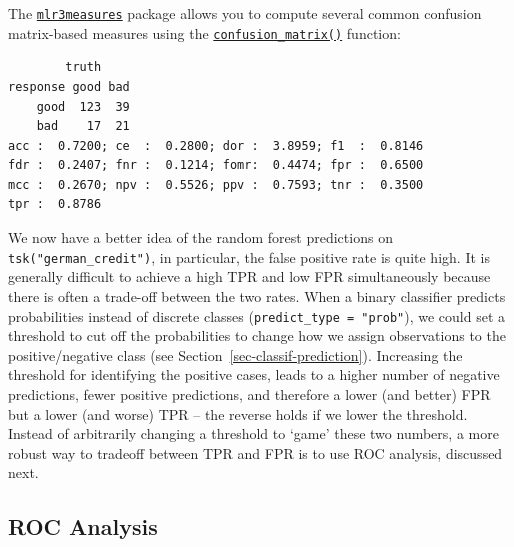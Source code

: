 The
\href{https://cran.r-project.org/package=mlr3measures}{\texttt{mlr3measures}}
package allows you to compute several common confusion matrix-based
measures using the
\href{https://www.rdocumentation.org/packages/mlr3measures/topics/confusion_matrix}{\texttt{confusion\_matrix()}}
function:

\begin{Shaded}
\begin{Highlighting}[]
\SpecialCharTok{::}\NormalTok{(}\SpecialCharTok{$}
  \SpecialCharTok{$}\SpecialCharTok{$}
\end{Highlighting}
\end{Shaded}

\begin{verbatim}
        truth
response good bad
    good  123  39
    bad    17  21
acc :  0.7200; ce  :  0.2800; dor :  3.8959; f1  :  0.8146 
fdr :  0.2407; fnr :  0.1214; fomr:  0.4474; fpr :  0.6500 
mcc :  0.2670; npv :  0.5526; ppv :  0.7593; tnr :  0.3500 
tpr :  0.8786 
\end{verbatim}

We now have a better idea of the random forest predictions on
\texttt{tsk("german\_credit")}, in particular, the false positive rate
is quite high. It is generally difficult to achieve a high TPR and low
FPR simultaneously because there is often a trade-off between the two
rates. When a binary classifier predicts probabilities instead of
discrete classes (\texttt{predict\_type\ =\ "prob"}), we could set a
threshold to cut off the probabilities to change how we assign
observations to the positive/negative class (see
Section~\ref{sec-classif-prediction}). Increasing the threshold for
identifying the positive cases, leads to a higher number of negative
predictions, fewer positive predictions, and therefore a lower (and
better) FPR but a lower (and worse) TPR -- the reverse holds if we lower
the threshold. Instead of arbitrarily changing a threshold to `game'
these two numbers, a more robust way to tradeoff between TPR and FPR is
to use ROC analysis, discussed next.

\hypertarget{sec-roc-space}{%
\subsection{ROC Analysis}\label{sec-roc-space}}

